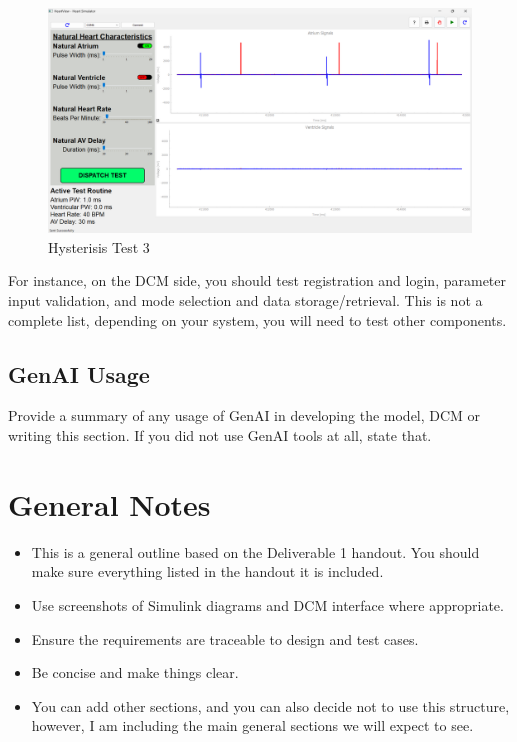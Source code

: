 \documentclass{article}
\begin{document}
\begin{tcolorbox}
    \begin{figure}[H]\label{Hystest3}
        \includegraphics[width=\textwidth]{hytheresistest3.png}
        \caption{Hysterisis Test 3}
        
    \end{figure}
\end{tcolorbox}

For instance, on the DCM side, you should test registration and login, parameter input validation, and mode selection and data storage/retrieval. This is not a complete list, depending on your system, you will need to test other components.

\subsection{GenAI Usage}
Provide a summary of any usage of GenAI in developing the model, DCM or writing this section. If you did not use GenAI tools at all, state that.

\section{General Notes}
\begin{itemize}
    \item This is a general outline based on the Deliverable 1 handout. You should make sure everything listed in the handout it is included. 
    \item Use screenshots of Simulink diagrams and DCM interface where appropriate.
    \item Ensure the requirements are traceable to design and test cases.
    \item Be concise and make things clear.
    \item You can add other sections, and you can also decide not to use this structure, however, I am including the main general sections we will expect to see.
\end{itemize}
\end{document}
